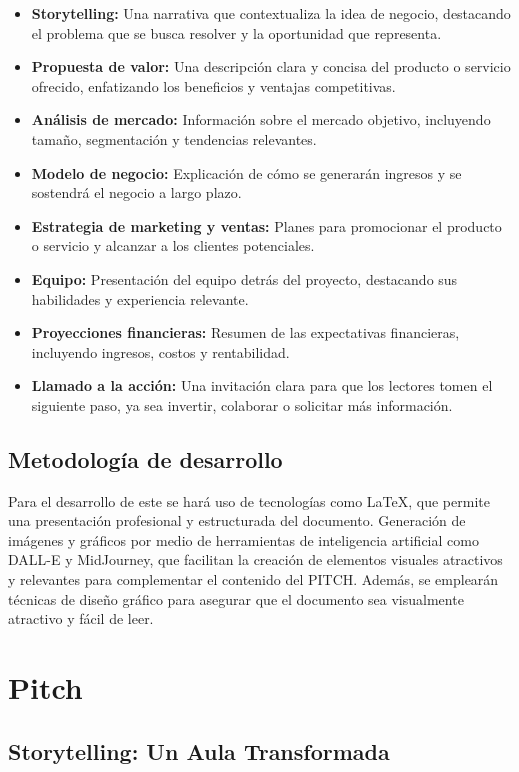 \begin{itemize}
  \item \textbf{Storytelling:} Una narrativa que contextualiza la idea de negocio, destacando el problema que se busca resolver y la oportunidad que representa.
  \item \textbf{Propuesta de valor:} Una descripción clara y concisa del producto o servicio ofrecido, enfatizando los beneficios y ventajas competitivas.
  \item \textbf{Análisis de mercado:} Información sobre el mercado objetivo, incluyendo tamaño, segmentación y tendencias relevantes.
  \item \textbf{Modelo de negocio:} Explicación de cómo se generarán ingresos y se sostendrá el negocio a largo plazo.
  \item \textbf{Estrategia de marketing y ventas:} Planes para promocionar el producto o servicio y alcanzar a los clientes potenciales.
  \item \textbf{Equipo:} Presentación del equipo detrás del proyecto, destacando sus habilidades y experiencia relevante.
  \item \textbf{Proyecciones financieras:} Resumen de las expectativas financieras, incluyendo ingresos, costos y rentabilidad.
  \item \textbf{Llamado a la acción:} Una invitación clara para que los lectores tomen el siguiente paso, ya sea invertir, colaborar o solicitar más información.
\end{itemize}

\subsection{Metodología de desarrollo}

Para el desarrollo de este se hará uso de tecnologías como \LaTeX, que permite una presentación profesional y estructurada del documento. Generación de imágenes y gráficos por medio de herramientas de inteligencia artificial como DALL-E y MidJourney, que facilitan la creación de elementos visuales atractivos y relevantes para complementar el contenido del PITCH. Además, se emplearán técnicas de diseño gráfico para asegurar que el documento sea visualmente atractivo y fácil de leer.

\section{Pitch}

\subsection{Storytelling: Un Aula Transformada}

